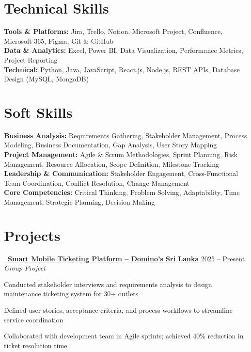 \documentclass[letterpaper,10pt]{article}
\newenvironment{resume_list}{
  \vspace{-1pt}
  \begin{itemize}[itemsep=2pt, leftmargin=14pt]
}{
  \end{itemize}\vspace{-2pt}
}
\begin{document}
\section{Technical Skills}
\vspace{-1pt}

\textbf{Tools \& Platforms:} Jira, Trello, Notion, Microsoft Project, Confluence, Microsoft 365, Figma, Git \& GitHub\\[2pt]
\textbf{Data \& Analytics:} Excel, Power BI, Data Visualization, Performance Metrics, Project Reporting\\[2pt]
\textbf{Technical:} Python, Java, JavaScript, React.js, Node.js, REST APIs, Database Design (MySQL, MongoDB)

\section{Soft Skills}
\vspace{-1pt}

\textbf{Business Analysis:} Requirements Gathering, Stakeholder Management, Process Modeling, Business Documentation, Gap Analysis, User Story Mapping\\[2pt]
\textbf{Project Management:} Agile \& Scrum Methodologies, Sprint Planning, Risk Management, Resource Allocation, Scope Definition, Milestone Tracking\\[2pt]
\textbf{Leadership \& Communication:} Stakeholder Engagement, Cross-Functional Team Coordination, Conflict Resolution, Change Management\\[2pt]
\textbf{Core Competencies:} Critical Thinking, Problem Solving, Adaptability, Time Management, Strategic Planning, Decision Making

\section{Projects}
\vspace{-1pt}

\href{https://github.com/fixpoint-tech}{\textbf{\faGithub~Smart Mobile Ticketing Platform – Domino's Sri Lanka}} \hfill 2025 – Present\\
\textit{Group Project}
\begin{resume_list}
  \item Conducted stakeholder interviews and requirements analysis to design maintenance ticketing system for 30+ outlets
  \item Defined user stories, acceptance criteria, and process workflows to streamline service coordination
  \item Collaborated with development team in Agile sprints; achieved 40\% reduction in ticket resolution time
\end{resume_list}
\end{document}
